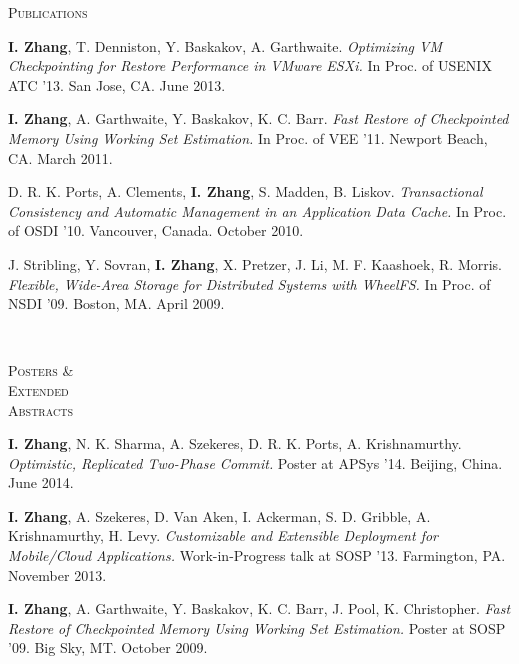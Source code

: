 \documentclass[10pt,times]{report}
\newlength{\sectiongap}
\newlength{\sectioncolwidth}
\newlength{\colgap}
\newlength{\stuffwidth}
\newenvironment{rtable}{
  \begin{minipage}{\textwidth}
  }{
  \end{minipage}
}
\newenvironment{rsection}[1]{
  \begin{minipage}[t]{\sectioncolwidth}
    \textsc{#1}
  \end{minipage}
  \hspace{\colgap}
  \begin{minipage}[t]{\stuffwidth}
  }{
    \removelastskip
  \end{minipage}
  \\[\sectiongap]
}
\begin{document}
\begin{rtable}
\begin{rsection}{Publications}
    \textbf{I. Zhang}, T. Denniston, Y. Baskakov, A. Garthwaite. \textit{Optimizing
      VM Checkpointing for Restore Performance in VMware ESXi.} In
    Proc. of USENIX ATC '13. San Jose, CA. June 2013.\\\vspace{-0.5em}

    \textbf{I. Zhang}, A. Garthwaite, Y. Baskakov, K. C. Barr. \textit{Fast
      Restore of Checkpointed Memory Using Working Set
      Estimation.} In Proc. of VEE '11. Newport Beach, CA. March
    2011.\\\vspace{-0.5em}

    D. R. K. Ports, A. Clements, \textbf{I. Zhang}, S. Madden,
    B. Liskov. \textit{Transactional Consistency and Automatic
      Management in an Application Data Cache.} In Proc. of OSDI
    '10. Vancouver, Canada. October 2010.\\\vspace{-0.5em}

    J. Stribling, Y. Sovran, \textbf{I. Zhang}, X. Pretzer, J. Li,
    M. F. Kaashoek, R. Morris. \textit{Flexible, Wide-Area Storage for
      Distributed Systems with WheelFS.} In Proc. of NSDI '09. Boston,
    MA. April 2009.
 \vspace{1.0em}
 \end{rsection}

  \begin{rsection}{Posters \&\\Extended\\Abstracts}
   \textbf{I. Zhang}, N. K. Sharma, A. Szekeres, D. R. K. Ports,
   A. Krishnamurthy. \textit{Optimistic, Replicated Two-Phase Commit.}
   Poster at APSys '14. Beijing, China. June 2014.\\\vspace{-0.5em}

    \textbf{I. Zhang}, A. Szekeres, D. Van Aken, I. Ackerman, S. D. Gribble,
   A. Krishnamurthy, H. Levy. \textit{Customizable and Extensible
     Deployment for Mobile/Cloud Applications.} Work-in-Progress talk
   at SOSP '13. Farmington, PA. November 2013.\\\vspace{-0.5em}

    \textbf{I. Zhang}, A. Garthwaite, Y. Baskakov, K. C. Barr, J. Pool,
    K. Christopher. \textit{Fast Restore of Checkpointed Memory Using
      Working Set Estimation.} Poster at SOSP '09. Big Sky,
    MT. October 2009.\\\vspace{-0.5em} 


\end{rsection}
\end{rtable}
\end{document}
